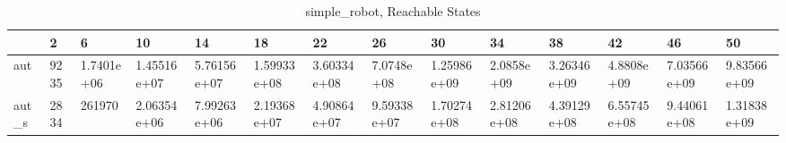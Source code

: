 \begin{table}
\caption{simple_robot, Reachable States}
\label{simple_robot_reach}
\begin{tabular}{llllllllllllll}
\toprule
 & 2 & 6 & 10 & 14 & 18 & 22 & 26 & 30 & 34 & 38 & 42 & 46 & 50 \\
\midrule
aut & 9235 & 1.7401e+06 & 1.45516e+07 & 5.76156e+07 & 1.59933e+08 & 3.60334e+08 & 7.0748e+08 & 1.25986e+09 & 2.0858e+09 & 3.26346e+09 & 4.8808e+09 & 7.03566e+09 & 9.83566e+09 \\
aut_s & 2834 & 261970 & 2.06354e+06 & 7.99263e+06 & 2.19368e+07 & 4.90864e+07 & 9.59338e+07 & 1.70274e+08 & 2.81206e+08 & 4.39129e+08 & 6.55745e+08 & 9.44061e+08 & 1.31838e+09 \\
\bottomrule
\end{tabular}
\end{table}
